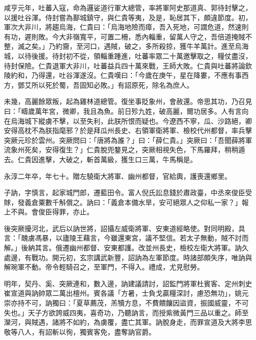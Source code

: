 \begin{pinyinscope}
 咸亨元年，吐蕃入寇，命為邏娑道行軍大總管，率將軍阿史那道真、郭待封擊之，以援吐谷渾。侍封嘗為鄯城鎮守，與仁貴等夷，及是，恥居其下，頗違節度。初，軍次大非川，將趨烏海，仁貴曰：「烏海地險而瘴，吾入死地，可謂危道，然速則有功，遲則敗。今大非嶺寬平，可置二柵，悉內輜重，留萬人守之，吾倍道掩賊不整，滅之矣。」乃約齎，至河口，遇賊，破之，多所殺掠，獲牛羊萬計。進至烏海城，以待後援。待封初不從，領輜重踵進，吐蕃率眾二十萬邀擊取之，糧仗盡沒，待封保險。仁貴退軍大非川，吐蕃益兵四十萬來戰，王師大敗。仁貴與吐蕃將論欽陵約和，乃得還，吐谷渾遂沒。仁貴嘆曰：「今歲在庚午，星在降婁，不應有事西方，鄧艾所以死於蜀，吾固知必敗。」有詔原死，除名為庶人。



 未幾，高麗餘眾叛，起為雞林道總管。復坐事貶象州，會赦還。帝思其功，乃召見曰：「疇歲萬年宮，微卿，我且為魚。前日殄九姓，破高麗，爾功居多。人有言向在烏海城下縱虜不擊，以至失利，此朕所恨而疑也。今遼西不寧，瓜、沙路絕，卿安得高枕不為朕指麾邪？於是拜瓜州長史、右領軍衛將軍、檢校代州都督，率兵擊突厥元珍於雲州。突厥問曰：「唐將為誰？」曰：「薛仁貴。」突厥曰：「吾聞薛將軍流象州死矣，安得復生？」仁貴脫兜鍪見之，突厥相視失色，下馬羅拜，稍稍遁去。仁貴因進擊，大破之，斬首萬級，獲生口三萬，牛馬稱是。



 永淳二年卒，年七十。贈左驍衛大將軍、幽州都督，官給輿，護喪還鄉里。



 子訥，字慎言，起家城門郎，遷藍田令。富人倪氏訟息錢於肅政臺，中丞來俊臣受賕，發義倉粟數千斛償之。訥曰：「義倉本備水旱，安可絕眾人之仰私一家？」報上不與。會俊臣得罪，亦止。



 後突厥擾河北，武后以訥世將，詔攝左威衛將軍、安東道經略使。對同明殿，具言：「醜虜馮暴，以廬陵王藉言，今雖還東宮，議不堅信。若太子無動，賊不討而解。」後納其言。俄遷幽州都督、安東都護。改並州長史，檢校左衛大將軍。訥久處邊，有戰功。開元初，玄宗講武新豐，詔訥為左軍節度。時諸部頗失序，唯訥與解琬軍不動。帝令輕騎召之，至軍門，不得入。禮成，尤見慰勞。



 明年，契丹、奚、突厥連和，數入邊，訥建議請討，詔監門將軍杜賓客、定州刺史崔宣道與訥帥眾二萬出檀州。賓各議「方暑，士負戈贏糧深討，慮恐無功」，姚元崇亦持不可，訥獨曰：「夏草薦茂，羔犢方息，不費饋饟因盜資，振國威靈，不可失也。」天子方欲誇威四夷，喜奇功，乃聽訥言，而授紫微黃門三品以重之。師至灤河，與賊遇，諸將不如約，為虜覆，盡亡其軍。訥脫身走，而罪宣道及大將李思敬等八人，有詔斬以徇，獨賓客免，盡奪訥官爵。




\end{pinyinscope}
